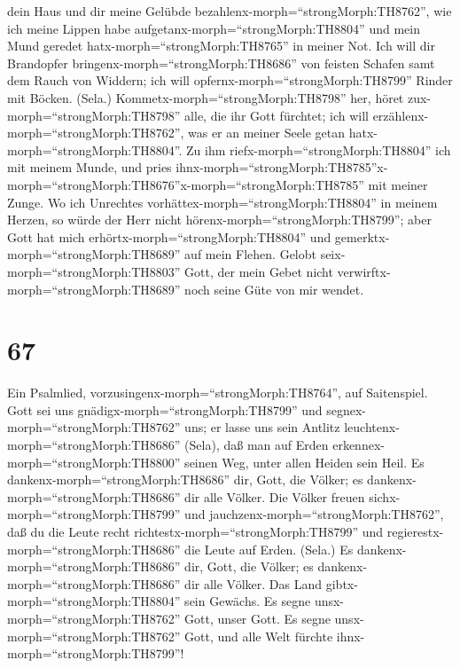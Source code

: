 dein Haus und dir meine Gelübde bezahlenx-morph=``strongMorph:TH8762'',
 wie ich meine Lippen habe
aufgetanx-morph=``strongMorph:TH8804'' und mein Mund geredet
hatx-morph=``strongMorph:TH8765'' in meiner Not.  Ich will
dir Brandopfer bringenx-morph=``strongMorph:TH8686'' von feisten Schafen
samt dem Rauch von Widdern; ich will
opfernx-morph=``strongMorph:TH8799'' Rinder mit Böcken. (Sela.)
 Kommetx-morph=``strongMorph:TH8798'' her, höret
zux-morph=``strongMorph:TH8798'' alle, die ihr Gott fürchtet; ich will
erzählenx-morph=``strongMorph:TH8762'', was er an meiner Seele getan
hatx-morph=``strongMorph:TH8804''.  Zu ihm
riefx-morph=``strongMorph:TH8804'' ich mit meinem Munde, und pries
ihnx-morph=``strongMorph:TH8785''\textbar x-morph=``strongMorph:TH8676''x-morph=``strongMorph:TH8785''
mit meiner Zunge.  Wo ich Unrechtes
vorhättex-morph=``strongMorph:TH8804'' in meinem Herzen, so würde der
Herr nicht hörenx-morph=``strongMorph:TH8799'';  aber Gott
hat mich erhörtx-morph=``strongMorph:TH8804'' und
gemerktx-morph=``strongMorph:TH8689'' auf mein Flehen. 
Gelobt seix-morph=``strongMorph:TH8803'' Gott, der mein Gebet nicht
verwirftx-morph=``strongMorph:TH8689'' noch seine Güte von mir wendet.

\hypertarget{section-66}{%
\section{67}\label{section-66}}

 Ein Psalmlied, vorzusingenx-morph=``strongMorph:TH8764'',
auf Saitenspiel. Gott sei uns gnädigx-morph=``strongMorph:TH8799'' und
segnex-morph=``strongMorph:TH8762'' uns; er lasse uns sein Antlitz
leuchtenx-morph=``strongMorph:TH8686'' (Sela),  daß man auf
Erden erkennex-morph=``strongMorph:TH8800'' seinen Weg, unter allen
Heiden sein Heil.  Es dankenx-morph=``strongMorph:TH8686''
dir, Gott, die Völker; es dankenx-morph=``strongMorph:TH8686'' dir alle
Völker.  Die Völker freuen
sichx-morph=``strongMorph:TH8799'' und
jauchzenx-morph=``strongMorph:TH8762'', daß du die Leute recht
richtestx-morph=``strongMorph:TH8799'' und
regierestx-morph=``strongMorph:TH8686'' die Leute auf Erden. (Sela.)
 Es dankenx-morph=``strongMorph:TH8686'' dir, Gott, die
Völker; es dankenx-morph=``strongMorph:TH8686'' dir alle Völker.
 Das Land gibtx-morph=``strongMorph:TH8804'' sein Gewächs.
Es segne unsx-morph=``strongMorph:TH8762'' Gott, unser Gott.
 Es segne unsx-morph=``strongMorph:TH8762'' Gott, und alle
Welt fürchte ihnx-morph=``strongMorph:TH8799''!

